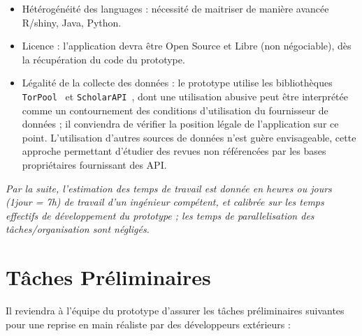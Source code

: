 \documentclass[11pt]{article}
\begin{document}
\begin{itemize}
\item Hétérogénéité des languages : nécessité de maitriser de manière avancée R/shiny, Java, Python.
\item Licence : l'application devra être Open Source et Libre (non négociable), dès la récupération du code du prototype.
\item Légalité de la collecte des données : le prototype utilise les bibliothèques \texttt{TorPool}~\cite{raimbault2016torpool} et \texttt{ScholarAPI}~\cite{raimbault2016scholar}, dont une utilisation abusive peut être interprétée comme un contournement des conditions d'utilisation du fournisseur de données ; il conviendra de vérifier la position légale de l'application sur ce point. L'utilisation d'autres sources de données n'est guère envisageable, cette approche permettant d'étudier des revues non référencées par les bases propriétaires fournissant des API.
\end{itemize}

\bigskip

\textit{Par la suite, l'estimation des temps de travail est donnée en heures ou jours (1jour = 7h) de travail d'un ingénieur compétent, et calibrée sur les temps effectifs de développement du prototype ; les temps de parallelisation des tâches/organisation sont négligés.}


\section{Tâches Préliminaires}

Il reviendra à l'équipe du prototype d'assurer les tâches préliminaires suivantes pour une reprise en main réaliste par des développeurs extérieurs :
\end{document}
